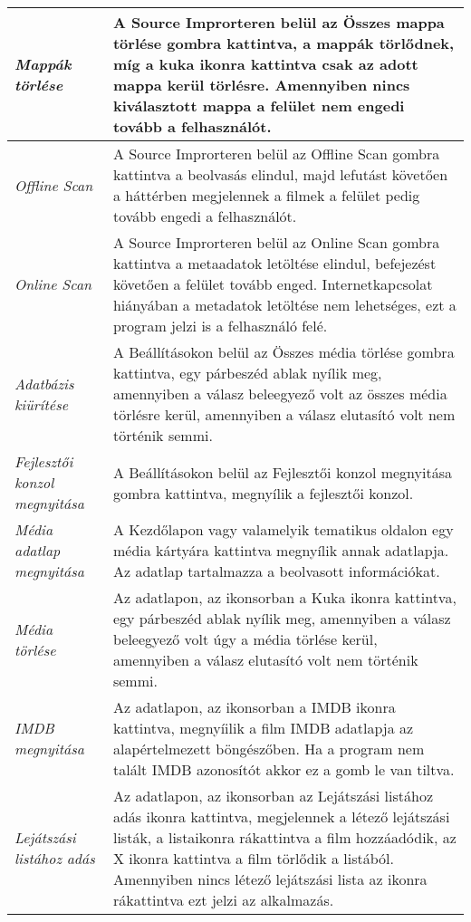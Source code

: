 \begin{center}
\begin{longtable}{ | p{} | p{} | }
        \emph{Mappák törlése}
		& A Source Improrteren belül az Összes mappa törlése gombra kattintva, a mappák törlődnek, míg a kuka ikonra kattintva csak az adott mappa kerül törlésre. Amennyiben nincs kiválasztott mappa a felület nem engedi tovább a felhasználót.
		\\ \hline

        \emph{Offline Scan}
		& A Source Improrteren belül az Offline Scan gombra kattintva a beolvasás elindul, majd lefutást követően a háttérben megjelennek a filmek a felület pedig tovább engedi a felhasználót.
		\\ \hline

        \emph{Online Scan}
		& A Source Improrteren belül az Online Scan gombra kattintva a metaadatok letöltése elindul, befejezést követően a felület tovább enged. Internetkapcsolat hiányában a metadatok letöltése nem lehetséges, ezt a program jelzi is a felhasználó felé.
		\\ \hline

        \emph{Adatbázis kiürítése}
		& A Beállításokon belül az Összes média törlése gombra kattintva, egy párbeszéd ablak nyílik meg, amennyiben a válasz beleegyező volt az összes média törlésre kerül, amennyiben a válasz elutasító volt nem történik semmi.
		\\ \hline

        \emph{Fejlesztői konzol megnyitása}
		& A Beállításokon belül az Fejlesztői konzol megnyitása gombra kattintva, megnyílik a fejlesztői konzol.
		\\ \hline

        \emph{Média adatlap megnyitása}
		& A Kezdőlapon vagy valamelyik tematikus oldalon egy média kártyára kattintva megnyílik annak adatlapja. Az adatlap tartalmazza a beolvasott információkat.
		\\ \hline

        \emph{Média törlése}
		& Az adatlapon, az ikonsorban a Kuka ikonra kattintva, egy párbeszéd ablak nyílik meg, amennyiben a válasz beleegyező volt úgy a média törlése kerül, amennyiben a válasz elutasító volt nem történik semmi.
		\\ \hline

        \emph{IMDB megnyitása}
		& Az adatlapon, az ikonsorban a IMDB ikonra kattintva, megnyíilik a film IMDB adatlapja az alapértelmezett böngészőben. Ha a program nem talált IMDB azonosítót akkor ez a gomb le van tiltva.
		\\ \hline

        \emph{Lejátszási listához adás}
		& Az adatlapon, az ikonsorban az Lejátszási listához adás ikonra kattintva, megjelennek a létező lejátszási listák, a listaikonra rákattintva a film hozzáadódik, az X ikonra kattintva a film törlődik a listából. Amennyiben nincs létező lejátszási lista az ikonra rákattintva ezt jelzi az alkalmazás.
		\\ \hline


\end{longtable}
\end{center}
